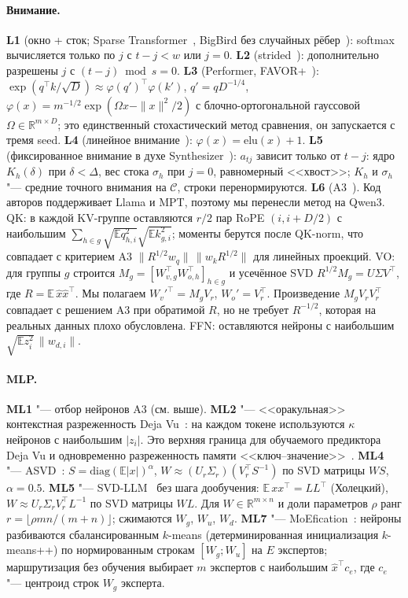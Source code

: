 \paragraph{Внимание.}
\textbf{L1} (окно + сток; Sparse Transformer~\cite{child2019sparse},
BigBird без случайных рёбер~\cite{zaheer2020bigbird}):
softmax вычисляется только по $j$ с $t-j<w$ или $j=0$.
\textbf{L2} (strided~\cite{child2019sparse}): дополнительно
разрешены $j$ с $(t-j)\bmod s=0$.
\textbf{L3} (Performer, FAVOR+~\cite{choromanski2021performer}):
$\exp(q^\top k/\sqrt D)\approx\varphi(q')^\top\varphi(k')$, $q'=qD^{-1/4}$,
$\varphi(x)=m^{-1/2}\exp(\Omega x-\|x\|^2/2)$ с блочно-ортогональной
гауссовой $\Omega\in\mathbb{R}^{m\times D}$; это единственный
стохастический метод сравнения, он запускается с тремя seed.
\textbf{L4} (линейное внимание~\cite{katharopoulos2020rnn}):
$\varphi(x)=\mathrm{elu}(x)+1$.
\textbf{L5} (фиксированное внимание в духе
Synthesizer~\cite{tay2021synthesizer}): $a_{tj}$ зависит только от
$t-j$: ядро $K_h(\delta)$ при $\delta<\Delta$, вес стока $\sigma_h$ при
$j=0$, равномерный <<хвост>>; $K_h$ и $\sigma_h$ "--- средние точного
внимания на $\mathcal C$, строки перенормируются.
\textbf{L6} (A3~\cite{wong2025a3}). Код авторов поддерживает Llama и
MPT, поэтому мы перенесли метод на Qwen3. QK: в каждой KV-группе
оставляются $r/2$ пар RoPE $(i,i+D/2)$ с наибольшим
$\sum_{h\in g}\sqrt{\mathbb E q_{h,i}^2}\sqrt{\mathbb E k_{g,i}^2}$; моменты
берутся после QK-norm, что совпадает с критерием A3
$\|R^{1/2}w_q\|\,\|w_k R^{1/2}\|$ для линейных проекций. VO: для группы
$g$ строится $M_g=[W_{v,g}^\top W_{o,h}^\top]_{h\in g}$ и усечённое
SVD $R^{1/2}M_g=U\Sigma V^\top$, где $R=\mathbb E\,\hat x\hat x^\top$. Мы
полагаем $W_v'^\top=M_gV_r$, $W_o'=V_r^\top$. Произведение $M_gV_rV_r^\top$
совпадает с решением A3 при обратимой $R$, но не требует $R^{-1/2}$,
которая на реальных данных плохо обусловлена. FFN: оставляются нейроны
с наибольшим $\sqrt{\mathbb E z_i^2}\,\|w_{d,i}\|$.

\paragraph{MLP.}
\textbf{ML1} "--- отбор нейронов A3 (см. выше).
\textbf{ML2} "--- <<оракульная>> контекстная разреженность Deja
Vu~\cite{liu2023dejavu}: на каждом токене используются $\kappa$
нейронов с наибольшим $|z_i|$. Это верхняя граница для обучаемого
предиктора Deja Vu и одновременно разреженность памяти
<<ключ--значение>>~\cite{geva2021ffn}.
\textbf{ML4} "--- ASVD~\cite{yuan2023asvd}: $S=\mathrm{diag}(\mathbb E|x|)^{\alpha}$,
$W\approx(U_r\Sigma_r)(V_r^\top S^{-1})$ по SVD матрицы $WS$, $\alpha=0.5$.
\textbf{ML5} "--- SVD-LLM~\cite{wang2025svdllm} без шага дообучения:
$\mathbb E\,xx^\top=LL^\top$ (Холецкий), $W\approx U_r\Sigma_rV_r^\top L^{-1}$
по SVD матрицы $WL$. Для $W\in\mathbb R^{m\times n}$ и доли параметров
$\rho$ ранг $r=\lfloor\rho mn/(m+n)\rfloor$; сжимаются $W_g$, $W_u$, $W_d$.
\textbf{ML7} "--- MoEfication~\cite{zhang2022moefication}: нейроны
разбиваются сбалансированным $k$-means (детерминированная инициализация
$k$-means++) по нормированным строкам $[W_g;W_u]$ на $E$ экспертов;
маршрутизация без обучения выбирает $m$ экспертов с наибольшим
$\hat x^\top c_e$, где $c_e$ "--- центроид строк $W_g$ эксперта.

